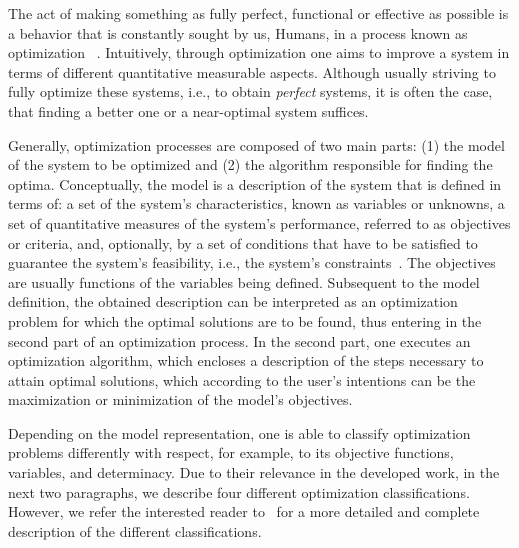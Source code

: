 \cleardoublepage
\label{chap:intro}

	The act of making something as fully perfect, functional or effective as possible is a behavior that is constantly sought by us, Humans, in a process known as optimization ~\cite{MerriamWebster2017-OptimizationDefinition}. Intuitively, through optimization one aims to improve a system in terms of different quantitative measurable aspects. Although usually striving to fully optimize these systems, i.e., to obtain \textit{perfect} systems, it is often the case, that finding a better one or a near-optimal system suffices.

	Generally, optimization processes are composed of two main parts: (1) the model of the system to be optimized and (2) the algorithm responsible for finding the optima. Conceptually, the model is a description of the system that is defined in terms of: a set of the system's characteristics, known as variables or unknowns, a set of quantitative measures of the system's performance, referred to as objectives or criteria, and, optionally, by a set of conditions that have to be satisfied to guarantee the system's feasibility, i.e., the system's constraints~\cite{Nocedal2011NumericalOptimization}. The objectives are usually functions of the variables being defined. Subsequent to the model definition, the obtained description can be interpreted as an optimization problem for which the optimal solutions are to be found, thus entering in the second part of an optimization process. In the second part, one executes an optimization algorithm, which encloses a description of the steps necessary to attain optimal solutions, which according to the user's intentions can be the maximization or minimization of the model's objectives.

	Depending on the model representation, one is able to classify optimization problems differently with respect, for example, to its objective functions, variables, and determinacy. Due to their relevance in the developed work, in the next two paragraphs, we describe four different optimization classifications. However, we refer the interested reader to~\cite{Nocedal2011NumericalOptimization} for a more detailed and complete description of the different classifications.

